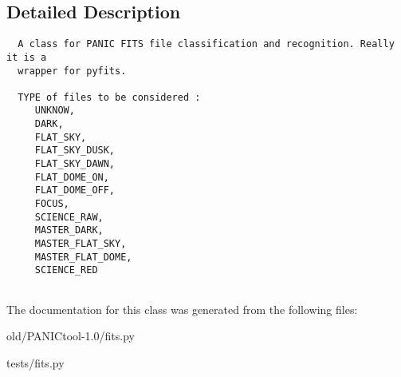 \subsection{Detailed Description}


\footnotesize\begin{verbatim}
  A class for PANIC FITS file classification and recognition. Really it is a
  wrapper for pyfits.

  TYPE of files to be considered :
     UNKNOW,
     DARK,
     FLAT_SKY,
     FLAT_SKY_DUSK,
     FLAT_SKY_DAWN,
     FLAT_DOME_ON,
     FLAT_DOME_OFF,
     FOCUS,
     SCIENCE_RAW,
     MASTER_DARK,
     MASTER_FLAT_SKY,
     MASTER_FLAT_DOME,
     SCIENCE_RED
     
\end{verbatim}
\normalsize
 



The documentation for this class was generated from the following files:\begin{CompactItemize}
\item 
old/PANICtool-1.0/fits.py\item 
tests/fits.py\end{CompactItemize}
